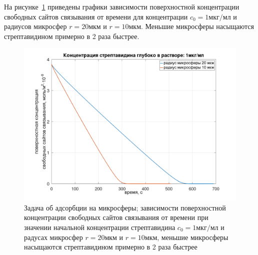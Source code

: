 \documentclass[oneside,final,12pt]{extreport}
\begin{document}
На рисунке~\ref{fig:sphere_stationary_big_small}
приведены графики зависимости поверхностной концентрации
свободных сайтов связывания от времени для концентрации
$c_0 = 1\text{мкг}/\text{мл}$ и радиусов микросфер
$r = 20\text{мкм}$ и $r = 10\text{мкм}$.
Меньшие микросферы насыщаются стрептавидином примерно в 2 раза быстрее.

\begin{figure}
  \centering
  \includegraphics[width=.7\textwidth]{pic/sphere_stationary_big_small}

  \caption{%
    \label{fig:sphere_stationary_big_small}%
    Задача об адсорбции на микросферы;
    зависимости поверхностной концентрации свободных сайтов связывания
    от времени при значении начальной концентрации стрептавидина
    $c_0 = 1\text{мкг}/\text{мл}$ и радусах микросфер
    $r = 20\text{мкм}$ и $r = 10\text{мкм}$,
    меньшие микросферы насыщаются стрептавидином примерно в 2 раза быстрее
  }

\end{figure}

\end{document}
